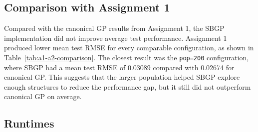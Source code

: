 \documentclass{article}
\begin{document}
\begin{table}[h]
\centering
{}
\caption{Comparison between Assignment 1 canonical GP and Assignment 2 SBGP mean test RMSE. Positive differences indicate that SBGP had higher error.}
\label{tab:a1-a2-comparison}
\end{table}

\subsection{Comparison with Assignment 1}

Compared with the canonical GP results from Assignment 1, the SBGP implementation did not improve average test performance. Assignment 1 produced lower mean test RMSE for every comparable configuration, as shown in Table~\ref{tab:a1-a2-comparison}. The closest result was the \texttt{pop=200} configuration, where SBGP had a mean test RMSE of 0.03089 compared with 0.02674 for canonical GP. This suggests that the larger population helped SBGP explore enough structures to reduce the performance gap, but it still did not outperform canonical GP on average.

\subsection{Runtimes}
\end{document}
